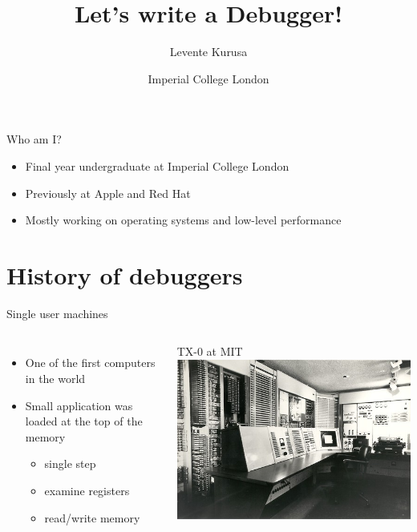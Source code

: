\documentclass{beamer} %
\title{Let's write a Debugger!}
\author{Levente Kurusa \myemail}
\date{Imperial College London}
\institute{\texttt{linux.conf.au 2018}, Sydney, Australia \hfill January 25, 2018}
\begin{document}
\maketitle

\begin{frame}{Who am I?}
\begin{itemize}
  \item Final year undergraduate at Imperial College London
  \item Previously at Apple and Red Hat
  \item Mostly working on operating systems and low-level performance
\end{itemize}
\end{frame}

\section{History of debuggers}

\begin{frame}{Single user machines}

\begin{columns}
\begin{itemize}
    \item One of the first computers in the world
    \item Small application was loaded at the top of the memory
      \begin{itemize}
          \item single step
          \item examine registers
          \item read/write memory
      \end{itemize}
\end{itemize}

\begin{block}{TX-0 at MIT}
\includegraphics[width=0.4\paperwidth]{tx0.jpg}
\end{block}

\end{columns}


\end{frame}
\end{document}

